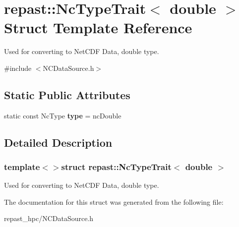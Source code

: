 \hypertarget{structrepast_1_1_nc_type_trait_3_01double_01_4}{\section{repast\-:\-:Nc\-Type\-Trait$<$ double $>$ Struct Template Reference}
\label{structrepast_1_1_nc_type_trait_3_01double_01_4}
}


Used for converting to Net\-C\-D\-F Data, double type.  




{\ttfamily \#include $<$N\-C\-Data\-Source.\-h$>$}

\subsection*{Static Public Attributes}
\begin{DoxyCompactItemize}
\item 
\hypertarget{structrepast_1_1_nc_type_trait_3_01double_01_4_a6cfe5fde4c4ad6e3c0d0bddb53642238}{static const Nc\-Type {\bfseries type} = nc\-Double}\label{structrepast_1_1_nc_type_trait_3_01double_01_4_a6cfe5fde4c4ad6e3c0d0bddb53642238}

\end{DoxyCompactItemize}


\subsection{Detailed Description}
\subsubsection*{template$<$$>$struct repast\-::\-Nc\-Type\-Trait$<$ double $>$}

Used for converting to Net\-C\-D\-F Data, double type. 

The documentation for this struct was generated from the following file\-:\begin{DoxyCompactItemize}
\item 
repast\-\_\-hpc/N\-C\-Data\-Source.\-h\end{DoxyCompactItemize}
